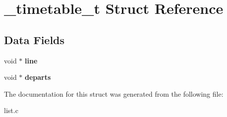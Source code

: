 \hypertarget{struct__timetable__t}{}\section{\+\_\+timetable\+\_\+t Struct Reference}
\label{struct__timetable__t}
\subsection*{Data Fields}
\begin{DoxyCompactItemize}
\item 
\hypertarget{struct__timetable__t_aa01c615868a936abd760a65b07e12e90}{}void $\ast$ {\bfseries line}\label{struct__timetable__t_aa01c615868a936abd760a65b07e12e90}

\item 
\hypertarget{struct__timetable__t_a115566951b3d329f862d39fd7141a34f}{}void $\ast$ {\bfseries departs}\label{struct__timetable__t_a115566951b3d329f862d39fd7141a34f}

\end{DoxyCompactItemize}


The documentation for this struct was generated from the following file\+:\begin{DoxyCompactItemize}
\item 
list.\+c\end{DoxyCompactItemize}
